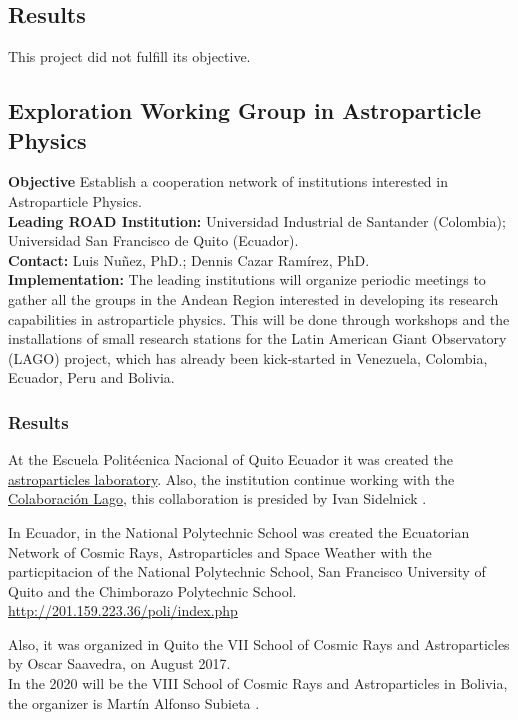 \subsection{Results}
This project did not fulfill its objective.


\subsection{Exploration Working Group in Astroparticle Physics}
\textbf{Objective} Establish a cooperation network of institutions interested in Astroparticle Physics.
\\
\textbf{Leading ROAD Institution:} Universidad Industrial de Santander (Colombia); Universidad San Francisco de Quito (Ecuador). 
\\
\textbf{Contact:} Luis Nuñez, PhD.; Dennis Cazar Ramírez, PhD.
\\
\textbf{Implementation:} The leading institutions will organize periodic meetings to gather all the groups in the Andean Region interested in developing its research capabilities in astroparticle physics. This will be done through workshops and the installations of small research stations for the Latin American Giant Observatory (LAGO) project, which has already been kick-started in Venezuela, Colombia, Ecuador, Peru and Bolivia.

\subsubsection{Results}
At the Escuela Politécnica Nacional of Quito Ecuador it was created the \href{http://201.159.223.36/poli/index.php}{astroparticles laboratory}. Also, the institution continue working with the \href{http://lagoproject.net/}{Colaboración Lago}, this collaboration is presided by Ivan Sidelnick .

In Ecuador, in the National Polytechnic School was created the Ecuatorian Network of Cosmic Rays, Astroparticles and Space Weather with the particpitacion of the National Polytechnic School, San Francisco University of Quito and the Chimborazo Polytechnic School. \href{Astroparticle Laboratory of the  National Polytechnic School}{http://201.159.223.36/poli/index.php}

Also, it was organized in Quito the VII School of Cosmic Rays and Astroparticles by Oscar Saavedra, on August 2017.
\\
In the 2020 will be the VIII School of Cosmic Rays and Astroparticles in Bolivia, the organizer is Martín Alfonso Subieta .


